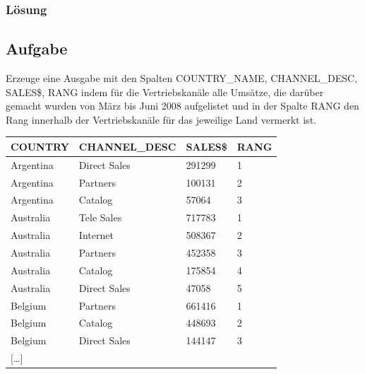 \subsubsection*{Lösung}
\label{subsubsec:uebung_07.aufgabe_04.loesung}


\label{subsec:uebung_07.aufgabe_05}
\subsection{Aufgabe}
Erzeuge eine Ausgabe mit den Spalten COUNTRY\_NAME, CHANNEL\_DESC, SALES\$, RANG indem für die Vertriebskanäle alle Umsätze, die darüber gemacht wurden von März bis Juni 2008 aufgelistet und in der Spalte RANG den Rang innerhalb der Vertriebskanäle für das jeweilige Land vermerkt ist.

\begin{table}[H]
  \centering
  \begin{tabular}{|l|l|l|l|}
    \hline
    \textbf{COUNTRY} & \textbf{CHANNEL\_DESC} & \textbf{SALES\$} & \textbf{RANG}  \\
    \hline
    Argentina        & Direct Sales           & 291299           & 1              \\
    Argentina        & Partners               & 100131           & 2              \\
    Argentina        & Catalog                & 57064            & 3              \\
    Australia        & Tele Sales             & 717783           & 1              \\
    Australia        & Internet               & 508367           & 2              \\
    Australia        & Partners               & 452358           & 3              \\
    Australia        & Catalog                & 175854           & 4              \\
    Australia        & Direct Sales           & 47058            & 5              \\
    Belgium          & Partners               & 661416           & 1              \\
    Belgium          & Catalog                & 448693           & 2              \\
    Belgium          & Direct Sales           & 144147           & 3              \\
    $[$\dots$]$      &                        &                  &                \\
    \hline
  \end{tabular}
\end{table}

